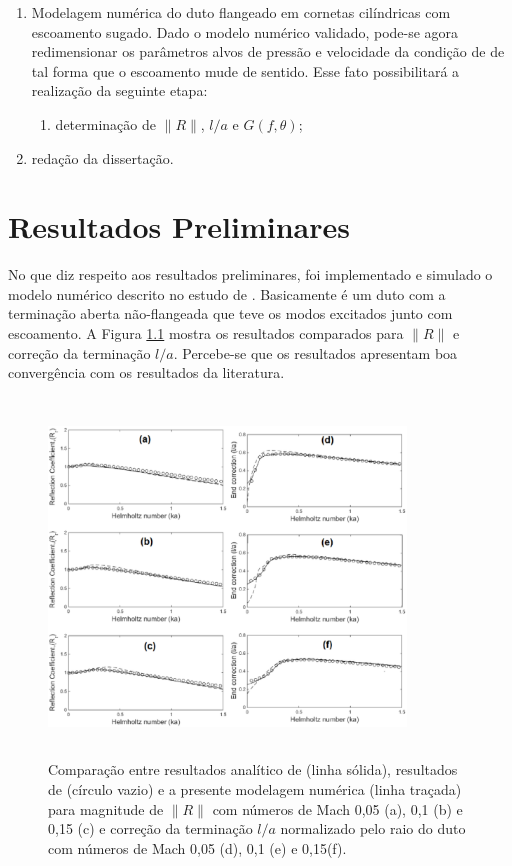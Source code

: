 \begin{enumerate}
    \item Modelagem numérica do duto flangeado em cornetas cilíndricas com escoamento sugado. Dado o modelo numérico validado, pode-se agora redimensionar os parâmetros alvos de pressão e velocidade da condição de  de tal forma que o escoamento mude de sentido. Esse fato possibilitará a realização da seguinte etapa:
        \begin{enumerate}
            \item determinação de $\|R\|$, $l/a$ e $G(f,\theta)$;
        \end{enumerate}
    \item redação da dissertação.
\end{enumerate}
 

\chapter{Resultados Preliminares}
\label{chapter:resultados}

No que diz respeito aos resultados preliminares, foi implementado e simulado o modelo numérico descrito no estudo de . Basicamente é um duto com a terminação aberta não-flangeada que teve os modos excitados junto com escoamento. A Figura \ref{fig:duto_1} mostra os resultados comparados para $\|R\|$ e correção da terminação $l/a$. Percebe-se que os resultados apresentam boa convergência com os resultados da literatura.

\begin{figure}[h]
	\centering
	 \includegraphics[width=9.5cm, height=9.5cm]{figuras/duto_1.eps}
	\caption{Comparação entre resultados analítico de  (linha sólida), resultados de  (círculo vazio) e a presente modelagem numérica (linha traçada) para magnitude de $\|R\|$ com números de Mach 0,05 (a), 0,1 (b) e 0,15 (c) e correção da terminação $l/a$ normalizado pelo raio do duto com números de Mach 0,05 (d), 0,1 (e) e 0,15(f).}
	\label{fig:duto_1}
\end{figure}

